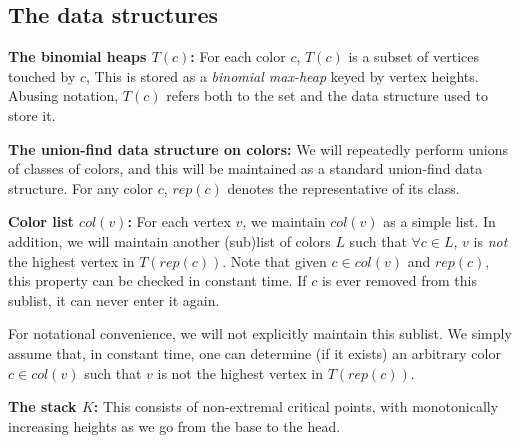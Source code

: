 \documentclass[11pt]{article}
\newcommand{\ignore}[1]{}
\theoremstyle{definition}
\newcommand{\col}{col}
\newcommand{\mcol}{mcol}
\newcommand{\rep}{rep}
\newcommand{\stack}{K}
\newcommand{\touch}{T}
\begin{document}
\subsection{The data structures} \label{sec:struct}
\noindent
{\bf The binomial heaps $\touch(c)$:} For each color $c$, $\touch(c)$ is a subset of vertices touched by $c$,
This is stored as a \emph{binomial max-heap} keyed by vertex heights. Abusing notation, $\touch(c)$ refers
both to the set and the data structure used to store it.

\medskip
\noindent
{\bf The union-find data structure on colors:} We will repeatedly perform unions
of classes of colors, and this will be maintained as a standard union-find data structure.
For any color $c$, $\rep(c)$ denotes the representative of its class. 

\medskip
\noindent
{\bf Color list $\col(v)$:} For each vertex $v$, we maintain $\col(v)$ as a simple list.
In addition, we will maintain another (sub)list of colors $L$ such that $\forall c \in L$,
$v$ is \emph{not} the highest vertex in $T(\rep(c))$. Note that given $c \in \col(v)$
and $\rep(c)$, this property can be checked in constant time. If $c$ is ever removed
from this sublist, it can never enter it again.

For notational convenience, we will not explicitly
maintain this sublist. We simply assume that, in constant
time, one can determine (if it exists) an arbitrary color $c \in \col(v)$ such that $v$ is not the highest vertex in $T(\rep(c))$.

\medskip
\noindent
{\bf The stack $\stack$:} This consists of non-extremal critical points, with monotonically increasing
heights as we go from the base to the head.
\ignore{
Each point $x \in \stack$ has an associated subset of $\col(x)$, denoted $\mcol(x)$.
Both $\mcol(x)$ and its complement are stored as hash table. So lookups, inserts, and deletes
are in these sets are all constant time operations. The stack is guaranteed to satisfy 
the following invariants.
\begin{asparaitem}
	\item For every $x \in \stack$: For every $c \in \mcol(x)$, $x$ is the highest element
	in $T(c)$. Furthermore, $c = \rep(c)$.
	\item Consider $x, y \in \stack$ such that $y$ was pushed on $x$. There exists $c \in \col(x) \setminus
	\mcol(x)$ such that $x$ is not highest in $T(c)$ but $y$ is highest in $T(c)$.
\end{asparaitem}
}
\end{document}
